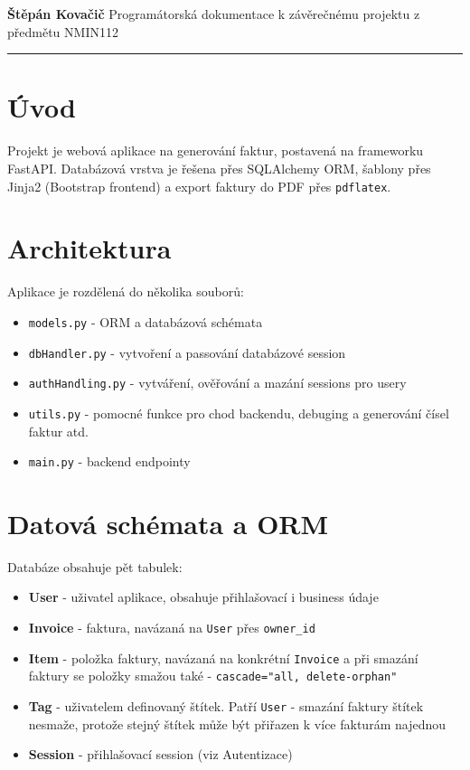 \documentclass[a4paper,12pt]{article}
\begin{document}
\noindent
{\large \textbf{Štěpán Kovačič}} \hfill {Programátorská dokumentace k závěrečnému projektu z předmětu NMIN112}\\[-0.2em]

\vspace{0.4em}
\hrule
\vspace{0.6em}

\section*{Úvod}
Projekt je webová aplikace na generování faktur, postavená na frameworku FastAPI.
Databázová vrstva je řešena přes SQLAlchemy ORM, šablony přes Jinja2 (Bootstrap
frontend) a export faktury do PDF přes \texttt{pdflatex}.

\section{Architektura}
Aplikace je rozdělená do několika souborů:
\begin{itemize}
    \item \texttt{models.py} - ORM a databázová schémata
    \item \texttt{dbHandler.py} - vytvoření a passování databázové session
    \item \texttt{authHandling.py} - vytváření, ověřování a mazání sessions pro usery
    \item \texttt{utils.py} - pomocné funkce pro chod backendu, debuging a generování čísel faktur atd.
    \item \texttt{main.py} - backend endpointy
\end{itemize}

\section{Datová schémata a ORM}
Databáze obsahuje pět tabulek:

\begin{itemize}
    \item \textbf{User} - uživatel aplikace, obsahuje přihlašovací i business
    údaje 
    \item \textbf{Invoice} - faktura, navázaná na \texttt{User} přes
    \texttt{owner\_id}
    \item \textbf{Item} - položka faktury, navázaná na konkrétní \texttt{Invoice} a při smazání faktury se položky smažou také -
    \texttt{cascade="all, delete-orphan"}
    \item \textbf{Tag} - uživatelem definovaný štítek. Patří
    \texttt{User} - smazání faktury štítek nesmaže, protože
    stejný štítek může být přiřazen k více fakturám najednou
    \item \textbf{Session} - přihlašovací session (viz Autentizace)
\end{itemize}
\end{document}
